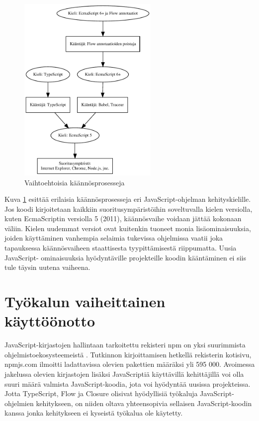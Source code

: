 \begin{figure}
\centering
\includegraphics[width=0.6\textwidth]{images/compilation.pdf}
\caption{Vaihtoehtoisia käännösprosesseja}
\label{fig:compilation}
\end{figure}

Kuva \ref{fig:compilation} esittää erilaisia käännösprosesseja eri
JavaScript-ohjelman kehityskielille. Jos koodi kirjoitetaan kaikkiin
suoritusympäristöihin soveltuvalla kielen versiolla, kuten EcmaScriptin
versiolla 5 (2011), käännösvaihe voidaan jättää kokonaan väliin. Kielen
uudemmat versiot ovat kuitenkin tuoneet monia lisäominaisuuksia, joiden
käyttäminen vanhempia selaimia tukevissa ohjelmissa vaatii joka tapauksessa
käännösvaiheen staattisesta tyypittämisestä riippumatta. Uusia JavaScript-
ominaisuuksia hyödyntäville projekteille koodin kääntäminen ei siis tule
täysin uutena vaiheena.

\section{Työkalun vaiheittainen käyttöönotto}

JavaScript-kirjastojen hallintaan tarkoitettu rekisteri npm on yksi
suurimmista ohjelmistoekosysteemeistä \cite{DynamicsOfJSPackages}.
Tutkinnon kirjoittamisen hetkellä rekisterin kotisivu, npmjs.com ilmoitti
ladattavissa olevien pakettien määräksi yli 595 000. Avoimessa jakelussa
olevien kirjastojen lisäksi JavaScriptiä käyttävillä kehittäjillä voi olla
suuri määrä valmista JavaScript-koodia, jota voi hyödyntää uusissa
projekteissa. Jotta TypeScript, Flow ja Closure olisivat hyödyllisiä
työkaluja JavaScript-ohjelmien kehitykseen, on niiden oltava yhteensopivia
sellaisen JavaScript-koodin kanssa jonka kehitykseen ei kyseistä työkalua
ole käytetty.

